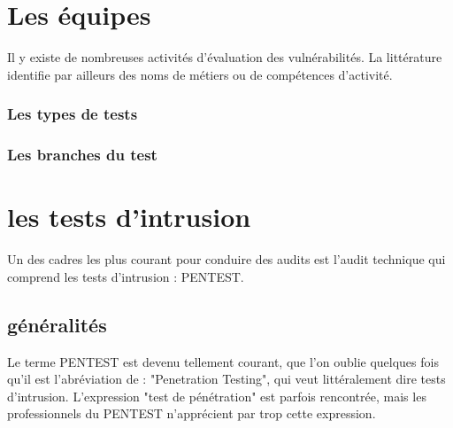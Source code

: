 \uchap{\jobname}

\section{Les équipes}

Il y existe de nombreuses activités d'évaluation des vulnérabilités. La littérature identifie par ailleurs des noms de métiers ou de compétences d'activité.

\begin{frame}
\frametitle<presentation>{Les types de tests}
\end{frame}


\begin{frame}
\frametitle<presentation>{Les branches du test}
\end{frame}




\section{les tests d'intrusion}

Un des cadres les plus courant pour conduire des audits est l'audit technique qui comprend les tests d'intrusion : PENTEST.

\subsection{généralités}

Le terme PENTEST est devenu tellement courant, que l'on oublie quelques fois qu'il est l'abréviation de : "Penetration Testing", qui  veut littéralement dire tests d'intrusion.  L'expression  "test de pénétration" est parfois rencontrée, mais les professionnels du PENTEST n'apprécient par trop cette expression. 

